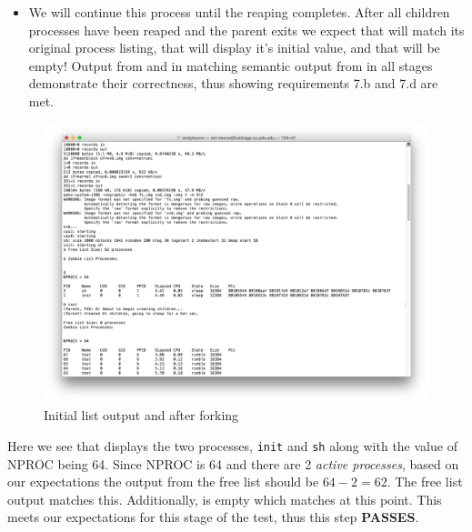 \documentclass[11pt,letterpaper]{report}
\begin{document}
\begin{itemize}
		\item We will continue this process until the reaping completes. After all children processes have been reaped and the parent exits we expect that  will match its original process listing, 
		that  will display it's initial value, and that  will be empty! Output from  and  in matching semantic output from  in all stages demonstrate their correctness, thus 
		showing requirements 7.b and 7.d are met.
		
		\end{itemize}
	
\pagebreak	

\begin{figure}[h]
\centering
\includegraphics[width=0.8\linewidth]{zombie-init.png}
\caption{Initial list output and after forking}
\label{fig:1}
\end{figure}	

Here we see that  displays the two processes, {\tt init} and  {\tt sh} along with the value of NPROC being 64. Since NPROC is 64 and there are 2 \emph{active processes}, based on our expectations the output from the free list should be $64-2=62$. The free list output matches this. Additionally,  is empty which matches  at this point. This meets our expectations for this stage of the test, thus this step \textbf{PASSES}.
\end{document}
